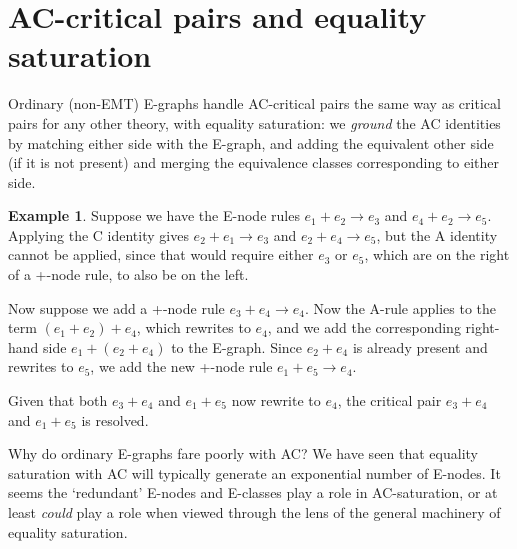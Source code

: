 \documentclass[12pt,a4paper,twoside,openright]{report}
\numberwithin{equation}{chapter}		%
\numberwithin{figure}{chapter}			%
\numberwithin{table}{chapter}			%
\theoremstyle{definition}
\newtheorem*{ex}{Example}
\theoremstyle{plain}
\begin{document}
\section{AC-critical pairs and equality saturation} \label{acsatbad}
Ordinary (non-EMT) E-graphs handle AC-critical pairs the same way as critical pairs for any other theory, with equality saturation: we \emph{ground} the AC identities by matching either side with the E-graph, and adding the equivalent other side (if it is not present) and merging the equivalence classes corresponding to either side.

\begin{ex}
	Suppose we have the E-node rules $e_1 + e_2 \rightarrow e_3$ and $e_4 + e_2 \rightarrow e_5$.
	Applying the C identity gives $e_2 + e_1 \rightarrow e_3$ and $e_2 + e_4 \rightarrow e_5$, but the A identity cannot be applied, since that would require either $e_3$ or $e_5$, which are on the right of a +-node rule, to also be on the left.
	
	Now suppose we add a +-node rule $e_3 + e_4 \rightarrow e_4$. Now the A-rule applies to the term $(e_1 + e_2) + e_4$, which rewrites to $e_4$, and we add the corresponding right-hand side $e_1 + (e_2 + e_4)$ to the E-graph. Since $e_2 + e_4$ is already present and rewrites to $e_5$, we add the new +-node rule $e_1 + e_5 \rightarrow e_4$.
	
	Given that both $e_3 + e_4$ and $e_1 + e_5$ now rewrite to $e_4$, the critical pair $e_3 + e_4$ and $e_1 + e_5$ is resolved.
\end{ex}

Why do ordinary E-graphs fare poorly with AC? We have seen that equality saturation with AC will typically generate an exponential number of E-nodes. It seems the `redundant' E-nodes and E-classes play a role in AC-saturation, or at least \emph{could} play a role when viewed through the lens of the general machinery of equality saturation.
\end{document}
